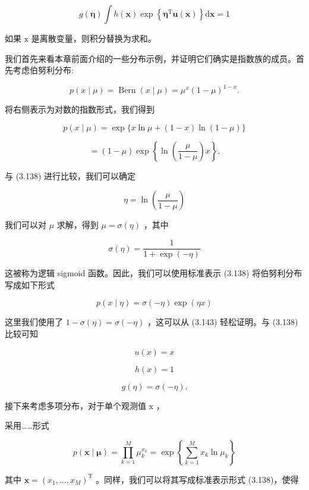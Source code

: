 \documentclass[10pt]{article}
\begin{document}
\[
g\left( \mathbf{\eta }\right) \int h\left( \mathbf{x}\right) \exp \left\{  {{\mathbf{\eta }}^{\mathrm{T}}\mathbf{u}\left( \mathbf{x}\right) }\right\}  \mathrm{d}\mathbf{x} = 1 \tag{3.139}
\]

如果 \(\mathrm{x}\) 是离散变量，则积分替换为求和。

我们首先来看本章前面介绍的一些分布示例，并证明它们确实是指数族的成员。首先考虑伯努利分布:

\[
p\left( {x \mid  \mu }\right)  = \operatorname{Bern}\left( {x \mid  \mu }\right)  = {\mu }^{x}{\left( 1 - \mu \right) }^{1 - x}. \tag{3.140}
\]

将右侧表示为对数的指数形式，我们得到

\[
p\left( {x \mid  \mu }\right)  = \exp \{ x\ln \mu  + \left( {1 - x}\right) \ln \left( {1 - \mu }\right) \}
\]

\[
= \left( {1 - \mu }\right) \exp \left\{  {\ln \left( \frac{\mu }{1 - \mu }\right) x}\right\}  . \tag{3.141}
\]

与 (3.138) 进行比较，我们可以确定

\[
\eta  = \ln \left( \frac{\mu }{1 - \mu }\right)  \tag{3.142}
\]

我们可以对 \(\mu\) 求解，得到 \(\mu  = \sigma \left( \eta \right)\) ，其中

\[
\sigma \left( \eta \right)  = \frac{1}{1 + \exp \left( {-\eta }\right) } \tag{3.143}
\]

这被称为逻辑 sigmoid 函数。因此，我们可以使用标准表示 (3.138) 将伯努利分布写成如下形式

\[
p\left( {x \mid  \eta }\right)  = \sigma \left( {-\eta }\right) \exp \left( {\eta x}\right)  \tag{3.144}
\]

这里我们使用了 \(1 - \sigma \left( \eta \right)  = \sigma \left( {-\eta }\right)\) ，这可以从 (3.143) 轻松证明。与 (3.138) 比较可知

\[
u\left( x\right)  = x \tag{3.145}
\]

\[
h\left( x\right)  = 1 \tag{3.146}
\]

\[
g\left( \eta \right)  = \sigma \left( {-\eta }\right) . \tag{3.147}
\]

接下来考虑多项分布，对于单个观测值 \(\mathrm{x}\) ，

采用……形式

\[
p\left( {\mathbf{x} \mid  \mathbf{\mu }}\right)  = \mathop{\prod }\limits_{{k = 1}}^{M}{\mu }_{k}^{{x}_{k}} = \exp \left\{  {\mathop{\sum }\limits_{{k = 1}}^{M}{x}_{k}\ln {\mu }_{k}}\right\}   \tag{3.148}
\]

其中 \(\mathbf{x} = {\left( {x}_{1},\ldots ,{x}_{M}\right) }^{\mathrm{T}}\) 。同样，我们可以将其写成标准表示形式 (3.138)，使得
\end{document}
